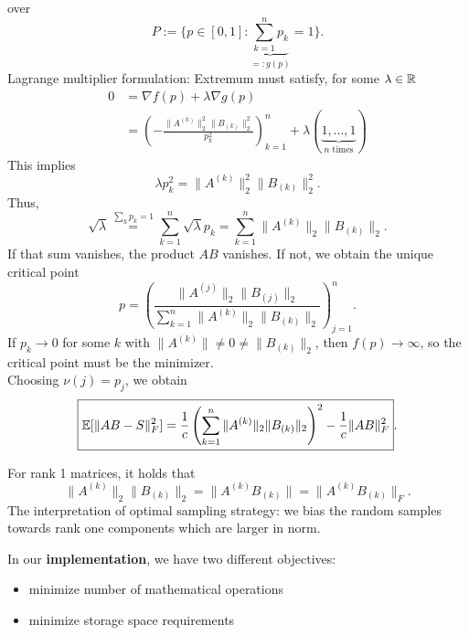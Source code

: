 over
$$
P:=\bigg\{p \in [0,1]: \underbrace{\sum_{k=1}^n p_k}_{=: g(p)} =1\bigg\}.
$$
Lagrange multiplier formulation: Extremum must satisfy, for some $\lambda \in \mathbb{R}$
\begin{equation*}
\begin{split}
0 & = \nabla f(p) + \lambda \nabla g(p) \\
& = \left(
- \frac{\|A^{(k)}\|_2^2 \|B_{(k)}\|_2^2}{p_k^2} 
\right)_{k=1}^n + \lambda (\underbrace{1,...,1}_{n \text{ times}})
\end{split}
\end{equation*}
This implies
\begin{equation*}
\lambda p_k^2 = \|A^{(k)}\|_2^2 \|B_{(k)}\|_2^2.
\end{equation*}
Thus,
$$
\sqrt{\lambda} \overset{\sum_{k}p_k=1}{=} \sum_{k=1}^n \sqrt{\lambda}p_k = \sum_{k=1}^n  \|A^{(k)}\|_2 \|B_{(k)}\|_2.
$$
If that sum vanishes, the product $AB$ vanishes. If not, we obtain the unique critical point
\begin{equation} \label{eq:opt-prob}
\boxed{
p = \left( 
\frac{\|A^{(j)}\|_2 \|B_{(j)}\|_2}{\sum_{k=1}^n \|A^{(k)}\|_2 \|B_{(k)}\|_2}
\right)_{j=1}^n
}.
\end{equation}
If $p_k \to 0$ for some $k$ with $\|A^{(k)}\|\neq 0 \neq \|B_{(k)}\|_2$, then $f(p) \to \infty$, so the critical point must be the minimizer. \\
Choosing $\nu(j) = p_j$, we obtain
\begin{equation} \label{eq:optimal-prob-error-est}
\boxed{\mathbb{E} [\|AB-S\|_F^2] = \frac{1}{c} \left( \sum_{k=1}^n \|A^{(k)}\|_2 \|B_{(k)}\|_2\right)^2- \frac{1}{c} \|AB\|_F^2}.
\end{equation}
\begin{remark*}
For rank 1 matrices, it holds that
\begin{equation}\label{eq:ident-rank-1-matr}
\boxed{\|A^{(k)}\|_2 \|B_{(k)}\|_2 = \|A^{(k)}B_{(k)}\| = \|A^{(k)}B_{(k)}\|_F}.
\end{equation}
The interpretation of optimal sampling strategy: we bias the random samples towards rank one components which are larger in norm.%
\end{remark*}
In our \textbf{implementation}, we have two different objectives: \vspace{-0.5pc}
\begin{itemize}[itemsep=0pt]
	\item minimize number of mathematical operations
	\item minimize storage space requirements
\end{itemize}

